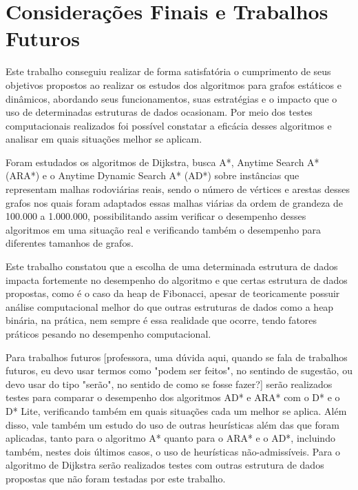 \chapter{Considerações Finais e Trabalhos Futuros}
\label{sec-conclusao}

Este trabalho conseguiu realizar de forma satisfatória o cumprimento de seus objetivos propostos ao realizar os estudos dos algoritmos para grafos estáticos e dinâmicos, abordando seus funcionamentos, suas estratégias e o impacto que o uso de determinadas estruturas de dados ocasionam. Por meio dos testes computacionais realizados foi possível constatar a eficácia desses algoritmos e analisar em quais situações melhor se aplicam.

Foram estudados os algoritmos de Dijkstra, busca A*, Anytime Search A* (ARA*) e o Anytime Dynamic Search A* (AD*) sobre instâncias que representam malhas rodoviárias reais, sendo o número de vértices e arestas desses grafos nos quais foram adaptados essas malhas viárias da ordem de grandeza de 100.000 a 1.000.000, possibilitando assim verificar o desempenho desses algoritmos em uma situação real e verificando também o desempenho para diferentes tamanhos de grafos.

Este trabalho constatou que a escolha de uma determinada estrutura de dados impacta fortemente no desempenho do algoritmo e que certas estrutura de dados propostas, como é o caso da heap de Fibonacci, apesar de teoricamente possuir análise computacional melhor do que outras estruturas de dados como a heap binária, na prática, nem sempre é essa realidade que ocorre, tendo fatores práticos pesando no desempenho computacional.

Para trabalhos futuros [professora, uma dúvida aqui, quando se fala de trabalhos futuros, eu devo usar termos como "podem ser feitos", no sentindo de sugestão, ou devo usar do tipo "serão", no sentido de como se fosse fazer?] serão realizados testes para comparar o desempenho dos algoritmos AD* e ARA* com o D* e o D* Lite, verificando também em quais situações cada um melhor se aplica. Além disso, vale também um estudo do uso de outras heurísticas além das que foram aplicadas, tanto para o algoritmo A* quanto para o ARA* e o AD*, incluindo também, nestes dois últimos casos, o uso de heurísticas não-admissíveis. Para o algoritmo de Dijkstra serão realizados testes com outras estrutura de dados propostas que não foram testadas por este trabalho.